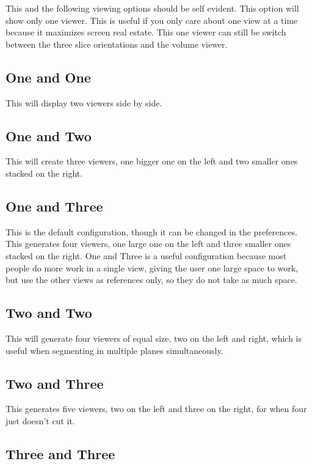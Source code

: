 \documentclass[fleqn,11pt,openany]{book}
\begin{document}
This and the following viewing options should be self evident.
This option will show only one viewer.
This is useful if you only care about one view at a time because it maximizes screen real estate.
This one viewer can still be switch between the three slice orientations and the volume viewer.  

\subsection{One and One}

This will display two viewers side by side.  

\subsection{One and Two}

This will create three viewers,  one bigger one on the left and two smaller ones stacked on the right.  

\subsection{One and Three}

This is the default configuration,  though it can be changed in the preferences.
This generates four viewers, one large one on the left and three smaller ones stacked on the right.
One and Three is a useful configuration because most people do more work in a single view, giving the user one large space to work, but use the other views as references only, so they do not take as much space.

\subsection{Two and Two}

This will generate four viewers of equal size, two on the left and right, which
is useful when segmenting in multiple planes simultaneously.

\subsection{Two and Three}

This generates five viewers, two on the left and three on the right, for when four just doesn't cut it.  

\subsection{Three and Three}
\end{document}
